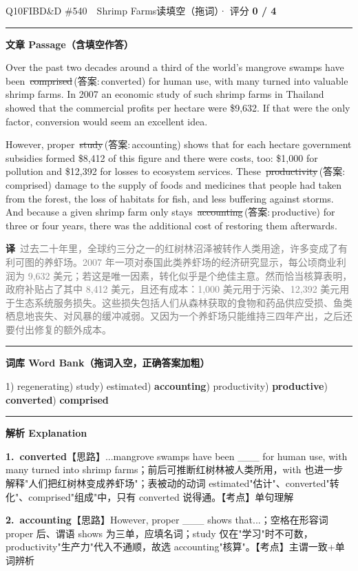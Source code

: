 \documentclass[11pt]{article}
\newcommand{\ptesub}[1]{%
  \par\needspace{2\baselineskip}\smallskip
  {\color{cAccent}\rule[-0.2ex]{3pt}{1.05em}}\hspace{6pt}%
  {\bfseries\color{cHead}#1}\par\nopagebreak\smallskip}
\newcommand{\zh}[1]{{\footnotesize\textcolor{cNote}{\textbf{译}}\ \textcolor{gray}{#1}}}
\newcommand{\rno}[2]{{\color{cWrong}\ding{55}\,\sout{#1}}\,{\footnotesize\color{cFix}(答案:\,#2)}}  %
\begin{document}
\begin{qblock}{Q10\quad FIBD\&D \#540\ \ Shrimp Farms}{读填空（拖词）· 评分 \textcolor{cAccent}{\bfseries 0 / 4}}
\ptesub{文章 Passage（含填空作答）}
\begin{promptbox}
Over the past two decades around a third of the world's mangrove swamps have been \rno{comprised}{converted} for human use, with many turned into valuable shrimp farms. In 2007 an economic study of such shrimp farms in Thailand showed that the commercial profits per hectare were \$9,632. If that were the only factor, conversion would seem an excellent idea.

However, proper \rno{study}{accounting} shows that for each hectare government subsidies formed \$8,412 of this figure and there were costs, too: \$1,000 for pollution and \$12,392 for losses to ecosystem services. These \rno{productivity}{comprised} damage to the supply of foods and medicines that people had taken from the forest, the loss of habitats for fish, and less buffering against storms. And because a given shrimp farm only stays \rno{accounting}{productive} for three or four years, there was the additional cost of restoring them afterwards.
\end{promptbox}
\zh{过去二十年里，全球约三分之一的红树林沼泽被转作人类用途，许多变成了有利可图的养虾场。2007 年一项对泰国此类养虾场的经济研究显示，每公顷商业利润为 9,632 美元；若这是唯一因素，转化似乎是个绝佳主意。然而恰当核算表明，政府补贴占了其中 8,412 美元，且还有成本：1,000 美元用于污染、12,392 美元用于生态系统服务损失。这些损失包括人们从森林获取的食物和药品供应受损、鱼类栖息地丧失、对风暴的缓冲减弱。又因为一个养虾场只能维持三四年产出，之后还要付出修复的额外成本。}
\ptesub{词库 Word Bank（拖词入空，正确答案加粗）}
{\small 1) regenerating) study) estimated) \textbf{accounting}) productivity) \textbf{productive}) \textbf{converted}) \textbf{comprised}}
\ptesub{解析 Explanation}
\begin{notebox}\footnotesize
\textbf{1.\ converted}\quad【思路】...mangrove swamps have been \_\_\_ for human use, with many turned into shrimp farms；前后可推断红树林被人类所用，with 也进一步解释"人们把红树林变成养虾场"；表被动的动词 estimated"估计"、converted"转化"、comprised"组成"中，只有 converted 说得通。【考点】单句理解\par\smallskip
\textbf{2.\ accounting}\quad【思路】However, proper \_\_\_ shows that...；空格在形容词 proper 后、谓语 shows 为三单，应填名词；study 仅在"学习"时不可数，productivity"生产力"代入不通顺，故选 accounting"核算"。【考点】主谓一致+单词辨析\par\smallskip

\end{notebox}
\end{qblock}
\end{document}
